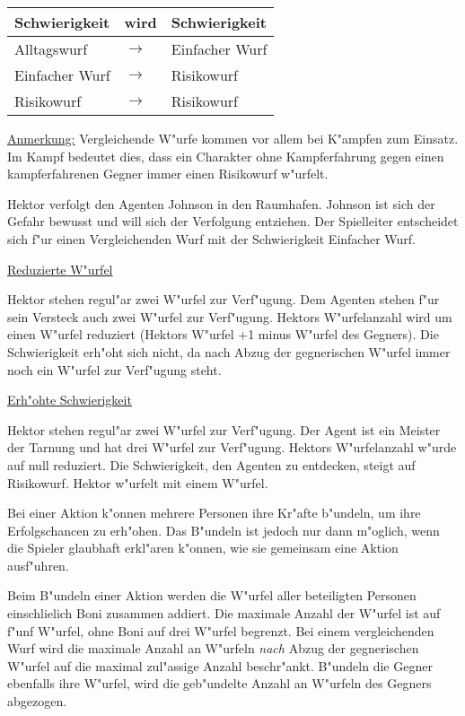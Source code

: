 \begin{center}\begin{tabular}{m{3cm} m{5.5ex} m{3.5cm}}
    \textbf{Schwierigkeit} & \textbf{wird} & \textbf{Schwierigkeit} \\\hline
    Alltagswurf            & $\rightarrow$ & Einfacher Wurf \\
    Einfacher Wurf         & $\rightarrow$ & Risikowurf \\
    Risikowurf             & $\rightarrow$ & Risikowurf \\
\end{tabular}\end{center}

\underline{Anmerkung:} Vergleichende W"urfe kommen vor allem bei K"ampfen zum Einsatz. Im Kampf bedeutet dies, dass ein Charakter ohne Kampferfahrung gegen einen kampferfahrenen Gegner immer einen Risikowurf w"urfelt.

\medskip
\begin{ruleexample}
    Hektor verfolgt den Agenten Johnson in den Raumhafen. Johnson ist sich der Gefahr bewusst und will sich der Verfolgung entziehen. Der Spielleiter entscheidet sich f"ur einen Vergleichenden Wurf mit der Schwierigkeit Einfacher Wurf.

    \underline{Reduzierte W"urfel}

    Hektor stehen regul"ar zwei W"urfel zur Verf"ugung. Dem Agenten stehen f"ur sein Versteck auch zwei W"urfel zur Verf"ugung. Hektors W"urfelanzahl wird um einen W"urfel reduziert (Hektors W"urfel +1 minus W"urfel des Gegners). Die Schwierigkeit erh"oht sich nicht, da nach Abzug der gegnerischen W"urfel immer noch ein W"urfel zur Verf"ugung steht.

    \underline{Erh"ohte Schwierigkeit}

    Hektor stehen regul"ar zwei W"urfel zur Verf"ugung. Der Agent ist ein Meister der Tarnung und hat drei W"urfel zur Verf"ugung. Hektors W"urfelanzahl w"urde auf null reduziert. Die Schwierigkeit, den Agenten zu entdecken, steigt auf Risikowurf. Hektor w"urfelt mit einem W"urfel.
\end{ruleexample}

Bei einer Aktion k"onnen mehrere Personen ihre Kr"afte b"undeln, um ihre Erfolgschancen zu erh"ohen. Das B"undeln ist jedoch nur dann m"oglich, wenn die Spieler glaubhaft erkl"aren k"onnen, wie sie gemeinsam eine Aktion ausf"uhren.

Beim B"undeln einer Aktion werden die W"urfel aller beteiligten Personen einschlie\3lich Boni zusammen addiert. Die maximale Anzahl der W"urfel ist auf f"unf W"urfel, ohne Boni auf drei W"urfel begrenzt. Bei einem vergleichenden Wurf wird die maximale Anzahl an W"urfeln \emph{nach} Abzug der gegnerischen W"urfel auf die maximal zul"assige Anzahl beschr"ankt. B"undeln die Gegner ebenfalls ihre W"urfel, wird die geb"undelte Anzahl an W"urfeln des Gegners abgezogen.

